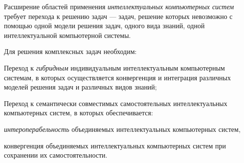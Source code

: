 Расширение областей применения \textit{интеллектуальных компьютерных систем} требует перехода к решению  задач --- задач, решение которых невозможно с помощью одной модели решения задач, одного вида знаний, одной интеллектуальной компьютерной системы.

Для решения комплексных задач необходим:
\begin{textitemize}
	\item Переход к \textit{гибридным} индивидуальным интеллектуальным компьютерным системам, в которых осуществляется конвергенция и интеграция различных моделей решения задач и различных видов знаний;	
	\item Переход к  семантически совместимых самостоятельных интеллектуальных компьютерных систем, в которых обеспечивается:
	\begin{textitemize}
		\item \textit{интероперабельность} объединяемых интеллектуальных компьютерных систем,
		\item конвергенция объединяемых интеллектуальных компьютерных систем при сохранении их самостоятельности.
	\end{textitemize}
\end{textitemize}


